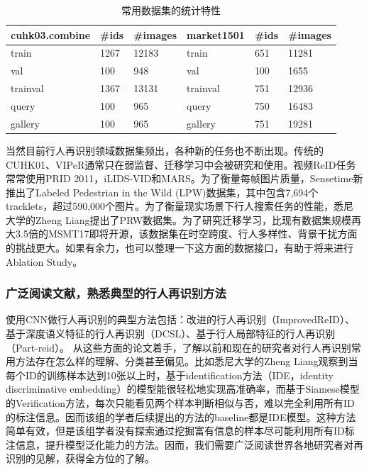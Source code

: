 \begin{table}[!htbp]
	\centering
	\captionsetup{width=.88\linewidth}
	\caption{\kaiti 常用数据集的统计特性}
	\label{table:dataset}
	\begin{tabular}{|l||l|l||l||l|l|}
		\hline
		cuhk03.combine & \#ids & \#images & market1501 & \#ids & \#images \\ \hline \hline
		train          & 1267  & 12183    & train      & 651   & 11281    \\ \hline
		val            & 100   & 948      & val        & 100   & 1655     \\ \hline
		trainval       & 1367  & 13131    & trainval   & 751   & 12936    \\ \hline
		query          & 100   & 965      & query      & 750   & 16483    \\ \hline
		gallery        & 100   & 965      & gallery    & 751   & 19281    \\ \hline
	\end{tabular}
\end{table}

当然目前行人再识别领域数据集频出，各种新的任务也不断出现。传统的CUHK01、VIPeR通常只在弱监督、迁移学习中会被研究和使用。视频ReID任务常常使用PRID 2011，iLIDS-VID和MARS。为了衡量每帧图片质量，Sensetime新推出了Labeled Pedestrian in the Wild (LPW)数据集，其中包含7,694个tracklets，超过590,000个图片。为了衡量现实场景下行人搜索任务的性能，悉尼大学的Zheng Liang提出了PRW数据集。为了研究迁移学习，比现有数据集规模再大3.5倍的MSMT17即将开源，该数据集在时空跨度、行人多样性、背景干扰方面的挑战更大。如果有余力，也可以整理一下这方面的数据接口，有助于将来进行Ablation Study。

\subsubsection{广泛阅读文献，熟悉典型的行人再识别方法}

使用CNN做行人再识别的典型方法包括：改进的行人再识别（ImprovedReID）、基于深度语义特征的行人再识别（DCSL）、基于行人局部特征的行人再识别（Part-reid）。
从这些方面的论文着手，了解以前和现在的研究者对行人再识别常用方法存在怎么样的理解、分类甚至偏见。比如悉尼大学的Zheng Liang观察到当每个ID的训练样本达到10张以上时，基于identification方法（IDE，identity discriminative embedding）的模型能很轻松地实现高准确率，而基于Siamese模型的Verification方法，每次只能看见两个样本判断相似与否，难以完全利用所有ID的标注信息。因而该组的学者后续提出的方法的baseline都是IDE模型。这种方法简单有效，但是该组学者没有探索通过挖掘富有信息的样本尽可能利用所有ID标注信息，提升模型泛化能力的方法。因而，我们需要广泛阅读世界各地研究者对再识别的见解，获得全方位的了解。

